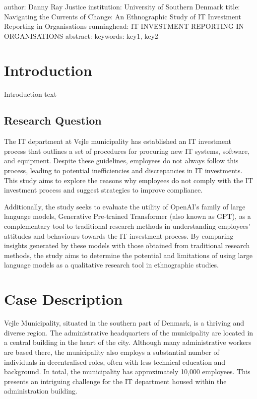 \documentclass[
]{book}
\author{}
\date{}
\begin{document}
\frontmatter

\mainmatter
author: Danny Ray Justice institution: University of Southern Denmark title: Navigating the Currents of Change: An Ethnographic Study of IT Investment Reporting in Organisations runninghead: IT INVESTMENT REPORTING IN ORGANISATIONS abstract: keywords: key1, key2

\hypertarget{introduction}{%
\section{Introduction}\label{introduction}}

Introduction text

\hypertarget{research-question}{%
\subsection{Research Question}\label{research-question}}

The IT department at Vejle municipality has established an IT investment process that outlines a set of procedures for procuring new IT systems, software, and equipment. Despite these guidelines, employees do not always follow this process, leading to potential inefficiencies and discrepancies in IT investments. This study aims to explore the reasons why employees do not comply with the IT investment process and suggest strategies to improve compliance.

Additionally, the study seeks to evaluate the utility of OpenAI's family of large language models, Generative Pre-trained Transformer (also known as GPT), as a complementary tool to traditional research methods in understanding employees' attitudes and behaviours towards the IT investment process. By comparing insights generated by these models with those obtained from traditional research methods, the study aims to determine the potential and limitations of using large language models as a qualitative research tool in ethnographic studies.

\hypertarget{case-description}{%
\section{Case Description}\label{case-description}}

Vejle Municipality, situated in the southern part of Denmark, is a thriving and diverse region. The administrative headquarters of the municipality are located in a central building in the heart of the city. Although many administrative workers are based there, the municipality also employs a substantial number of individuals in decentralised roles, often with less technical education and background. In total, the municipality has approximately 10,000 employees. This presents an intriguing challenge for the IT department housed within the administration building.
\end{document}
